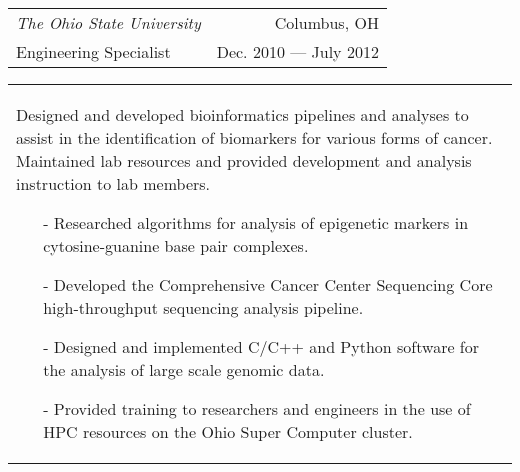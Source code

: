 \begin{tabularx}{\textwidth}{ L R }
    \normalsize\textit{The Ohio State University} & Columbus, OH \\
    Engineering Specialist & Dec. 2010 --- July 2012 \\
\end{tabularx}
\begin{tabularx}{\textwidth}{ X }
    \vspace{1pt}
    Designed and developed bioinformatics pipelines and analyses to assist in the identification of biomarkers for various forms of cancer. Maintained lab resources and provided development and analysis instruction to lab members.
    \begin{itemize}
        \itemsep{}
        \item[-] Researched algorithms for analysis of epigenetic markers in cytosine-guanine base pair complexes.
        \item[-] Developed the Comprehensive Cancer Center Sequencing Core high-throughput sequencing analysis pipeline.
        \item[-] Designed and implemented C/C++ and Python software for the analysis of large scale genomic data.
        \item[-] Provided training to researchers and engineers in the use of HPC resources on the Ohio Super Computer cluster.
    \end{itemize}
\end{tabularx}


